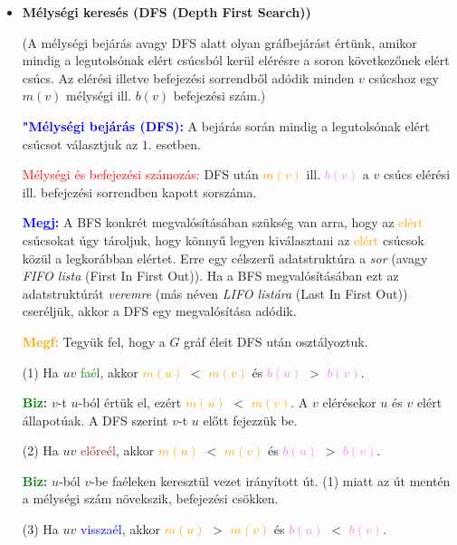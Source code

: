 \documentclass[../../szobeli.tex]{subfiles}
\begin{document}
\begin{itemize}
        \item \textbf{Mélységi keresés (DFS (Depth First Search))}
            
            (A mélységi bejárás avagy DFS alatt olyan gráfbejárást értünk, amikor mindig a legutolsónak elért csúcsból kerül elérésre a soron következőnek elért csúcs. Az elérési illetve befejezési sorrendből adódik minden $v$ csúcshoz egy $m(v)$ mélységi ill. $b(v)$ befejezési szám.)

            \textcolor{blue}{\textbf{"Mélységi bejárás (DFS):}} A bejárás során mindig a legutolsónak elért csúcsot választjuk az $\boxed{1.}$ esetben.

            \textcolor{red}{Mélységi és befejezési számozás:} DFS után \textcolor{orange}{$m(v)$} ill. \textcolor{violet}{$b(v)$} a $v$ csúcs elérési ill. befejezési sorrendben kapott sorszáma.

            \textcolor{blue}{\textbf{Megj:}} A BFS konkrét megvalósításában szükség van arra, hogy az \textcolor{orange}{elért} csúcsokat úgy tároljuk, hogy könnyű legyen kiválasztani az \textcolor{orange}{elért} csúcsok közül a legkorábban elértet. Erre egy célszerű adatstruktúra a \textit{sor} (avagy \textit{FIFO lista} (First In First Out)). Ha a BFS megvalósításában ezt az adatstruktúrát \textit{veremre} (más néven \textit{LIFO listára} (Last In First Out)) cseréljük, akkor a DFS egy megvalósítása adódik.

            \textcolor{orange}{\textbf{Megf:}} Tegyük fel, hogy a $G$ gráf éleit DFS után osztályoztuk. 
            
            (1) Ha $uv$ \textcolor{green}{faél}, akkor \textcolor{orange}{$m(u)$} $<$ \textcolor{orange}{$m(v)$} és \textcolor{violet}{$b(u)$} $>$ \textcolor{violet}{$b(v)$}.

            \textcolor{green}{\textbf{Biz:}} $v$-t $u$-ból értük el, ezért \textcolor{orange}{$m(u)$} $<$ \textcolor{orange}{$m(v)$}. A $v$ elérésekor $u$ és $v$ elért állapotúak. A DFS szerint $v$-t $u$ előtt fejezzük be.   

            (2) Ha $uv$ \textcolor{brown}{előreél}, akkor \textcolor{orange}{$m(u)$} $<$ \textcolor{orange}{$m(v)$} és \textcolor{violet}{$b(u)$} $>$ \textcolor{violet}{$b(v)$}.

            \textcolor{green}{\textbf{Biz:}} $u$-ból $v$-be faéleken keresztül vezet irányított út. (1) miatt az út mentén a mélységi szám növekszik, befejezési csökken.  

            (3) Ha $uv$ \textcolor{blue}{visszaél}, akkor \textcolor{orange}{$m(u)$} $>$ \textcolor{orange}{$m(v)$} és \textcolor{violet}{$b(u)$} $<$ \textcolor{violet}{$b(v)$}.


\end{itemize}
\end{document}
